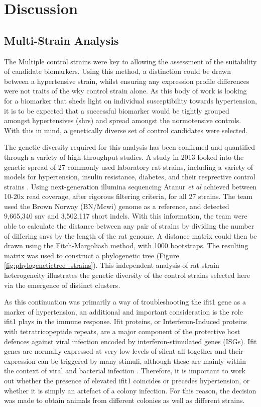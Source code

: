 \section{Discussion}

\subsection{Multi-Strain Analysis}

The Multiple control strains were key to allowing the assessment of the suitability of candidate biomarkers. Using this method, a distinction could be drawn between a hypertensive strain, whilst ensuring any expression profile differences were not traits of the \acrshort{wky} control strain alone. As this body of work is looking for a biomarker that sheds light on individual susceptibility towards hypertension, it is to be expected that a successful biomarker would be tightly grouped amongst hypertensives (\acrshort{shr}s) and spread amongst the normotensive controls. With this in mind, a genetically diverse set of control candidates were selected. 

The genetic diversity required for this analysis has been confirmed and quantified through a variety of high-throughput studies. A study in 2013 looked into the genetic spread of 27 commonly used laboratory rat strains, including a variety of models for hypertension, insulin resistance, diabetes, and their resprective control strains \cite{Atanur2013}. Using next-generation illumina sequencing Atanur \textit{et al} achieved between 10-20x read coverage, after rigorous filtering criteria, for all 27 strains. The team used the Brown Norway (BN/Mcwi) genome as a reference, and detected 9,665,340 \acrfull{snv} and 3,502,117 short indels. With this information, the team were able to calculate the distance between any pair of strains by dividing the number of differing \acrshort{snv}s by the length of the rat genome. A distance matrix could then be drawn using the Fitch-Margoliash method, with 1000 bootstraps. The resulting matrix was used to construct a phylogenetic tree (Figure \ref{fig:phylogenetictree_strains}). This independent analysis of rat strain heterogeneity illustrates the genetic diversity of the control strains selected here via the emergence of distinct clusters. 

As this continuation was primarily a way of troubleshooting the ifit1 gene as a marker of hypertension, an additional and important consideration is the role ifit1 plays in the immune response. Ifit proteins, or Interferon-Induced proteins with tetratricopeptide repeats, are a major component of the protective host defences against viral infection encoded by interferon-stimulated genes (ISGs). Ifit genes are normally expressed at very low levels of silent all together and their expression can be triggered by many stimuli, although these are mainly within the context of viral and bacterial infection \cite{Fensterl2015}. Therefore, it is important to work out whether the presence of elevated ifit1 coincides or precedes hypertension, or whether it is simply an artefact of a colony infection. For this reason, the decision was made to obtain animals from different colonies as well as different strains. 

